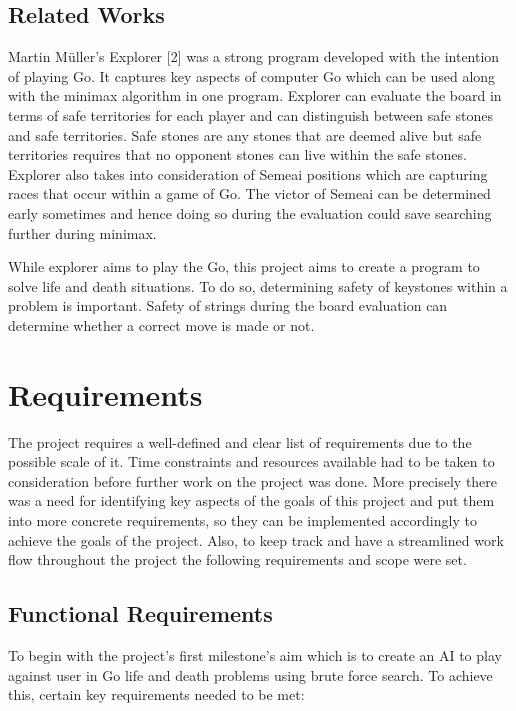 \documentclass{l4proj}
\begin{document}
\section{Related Works}
Martin Müller's Explorer [2] was a strong program developed with the intention of playing Go. It captures key aspects of computer Go which can be used along with the minimax algorithm in one program. Explorer can evaluate the board in terms of safe territories for each player and can distinguish between safe stones and safe territories. Safe stones are any stones that are deemed alive but safe territories requires that no opponent stones can live within the safe stones. Explorer also takes into consideration of Semeai positions which are capturing races that occur within a game of Go. The victor of Semeai can be determined early sometimes and hence doing so during the evaluation could save searching further during minimax.

While explorer aims to play the Go, this project aims to create a program to solve life and death situations. To do so, determining safety of keystones within a problem is important.  Safety of strings during the board evaluation can determine whether a correct move is made or not.







\chapter{Requirements}


The project requires a well-defined and clear list of requirements due to the possible scale of it. Time constraints and resources available had to be taken to consideration before further work on the project was done. More precisely there was a need for identifying key aspects of the goals of this project and put them into more concrete requirements, so they can be implemented accordingly to achieve the goals of the project. Also, to keep track and have a streamlined work flow throughout the project the following requirements and scope were set.

\section{Functional Requirements}
To begin with the project's first milestone's aim which is to create an AI to play against user in Go life and death problems using brute force search. To achieve this, certain key requirements needed to be met:
\end{document}
